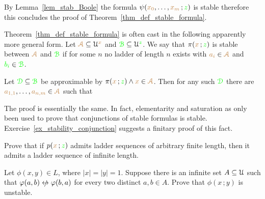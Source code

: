 


By Lemma~\ref{lem_stab_Boole} the formula $\psi({\color{brown} x_0},\dots,{\color{brown} x_m}\,;{\color{green} z})$ is stable therefore this concludes the proof of Theorem~\ref{thm_def_stable_formula}. 

\begin{remark}\label{rem_sability_no_compactness}
  Theorem~\ref{thm_def_stable_formula} is often cast in the following  apparently more general form.
  Let ${\color{brown}\EuScript A}\subseteq\EuScript U^{\color{brown} x}$ and ${\color{green}\EuScript B}\subseteq\EuScript U^{\color{green} z}$.
  We say that $\pi({\color{brown} x}\,;{\color{green} z})$ is stable between ${\color{brown}\EuScript A}$ and ${\color{green}\EuScript B}$ if for some $n$ no ladder of length $n$ exists with ${\color{brown} a_i}\in{\color{brown}\EuScript A}$ and ${\color{green} b_i}\in{\color{green}\EuScript B}$.

  Let ${\color{green}\EuScript D}\subseteq{\color{green}\EuScript B}$ be approximable by $\pi({\color{brown} x}\,;{\color{green} z})\wedge {\color{brown}x}\in{\color{brown}\EuScript A}$.
  Then for any such ${\color{green}\EuScript D}$ there are ${\color{brown} a_{1,1}},\dots,{\color{brown} a_{n,m}}\in {\color{brown}\EuScript A}$ such that 
  
  
  The proof is essentially the same. 
  In fact, elementarity and saturation as only been used to prove that conjunctions of stable formulas is stable.
  Exercise~\ref{ex_stability_conjunction} suggests a finitary proof of this fact.
\end{remark} 


\begin{exercise}
  Prove that if $p({\color{brown} x}\,;{\color{green} z})$ admits ladder sequences of arbitrary finite length, then it admits a ladder sequence of infinite length.
\end{exercise}

\begin{exercise}
  Let $\phi(x,y)\in  L$, where $|x|=|y|=1$.
  Suppose there is an infinite set $A\subseteq\EuScript U$ such that $\phi(a,b)\niff\phi(b,a)$ for every two distinct $a,b\in A$.
  Prove that $\phi(x\,;y)$ is unstable.
\end{exercise}


